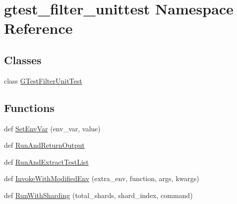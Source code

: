 \hypertarget{namespacegtest__filter__unittest}{}\section{gtest\+\_\+filter\+\_\+unittest Namespace Reference}
\label{namespacegtest__filter__unittest}
\subsection*{Classes}
\begin{DoxyCompactItemize}
\item 
class \hyperlink{classgtest__filter__unittest_1_1_g_test_filter_unit_test}{G\+Test\+Filter\+Unit\+Test}
\end{DoxyCompactItemize}
\subsection*{Functions}
\begin{DoxyCompactItemize}
\item 
def \hyperlink{namespacegtest__filter__unittest_a8ba027a73134bf97696651252457b492}{Set\+Env\+Var} (env\+\_\+var, value)
\item 
def \hyperlink{namespacegtest__filter__unittest_a0857c50074aab02b06bd5d31a20c3800}{Run\+And\+Return\+Output}
\item 
def \hyperlink{namespacegtest__filter__unittest_ad7b84d938fa6f616b33a47ae169c66e4}{Run\+And\+Extract\+Test\+List}
\item 
def \hyperlink{namespacegtest__filter__unittest_a2bfd6ae10e7002148bc25e505bd61534}{Invoke\+With\+Modified\+Env} (extra\+\_\+env, function, args, kwargs)
\item 
def \hyperlink{namespacegtest__filter__unittest_a4d88cc7e4faf5305640a66dc487b33fb}{Run\+With\+Sharding} (total\+\_\+shards, shard\+\_\+index, command)
\end{DoxyCompactItemize}
